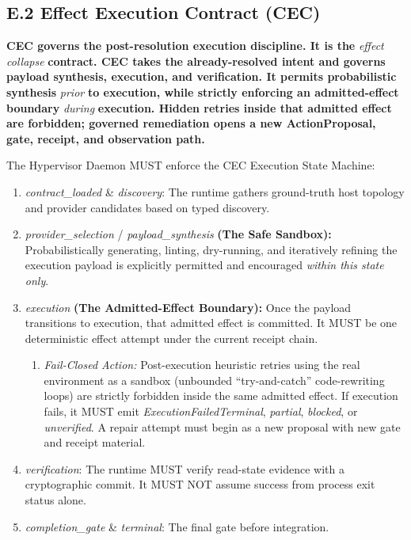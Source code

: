 \documentclass[
  11pt,
]{article}
\providecommand{\tightlist}{%
  \setlength{\itemsep}{0pt}\setlength{\parskip}{0pt}}
\begin{document}
\hypertarget{e.2-effect-execution-contract-cec}{%
\subsection{E.2 Effect Execution Contract
(CEC)}\label{e.2-effect-execution-contract-cec}}

\textbf{CEC governs the post-resolution execution discipline. It is the
}\emph{effect collapse}\textbf{ contract. CEC takes the already-resolved
intent and governs payload synthesis, execution, and verification. It
permits probabilistic synthesis }\emph{prior}\textbf{ to execution,
while strictly enforcing an admitted-effect boundary }\emph{during}\textbf{
execution. Hidden retries inside that admitted effect are forbidden;
governed remediation opens a new ActionProposal, gate, receipt, and
observation path.}

The Hypervisor Daemon MUST enforce the CEC Execution State Machine:

\begin{enumerate}
\def\labelenumi{\arabic{enumi}.}
\item
  \emph{contract\_loaded} \& \emph{discovery}: The runtime gathers
  ground-truth host topology and provider candidates based on typed
  discovery.
\item
  \emph{provider\_selection} / \emph{payload\_synthesis} \textbf{(The
  Safe Sandbox):} Probabilistically generating, linting, dry-running,
  and iteratively refining the execution payload is explicitly permitted
  and encouraged \emph{within this state only}.
\item
  \emph{execution} \textbf{(The Admitted-Effect Boundary):} Once the
  payload transitions to execution, that admitted effect is committed.
  It MUST be one deterministic effect attempt under the current receipt
  chain.

  \begin{enumerate}
  \def\labelenumii{\arabic{enumii}.}
  \tightlist
  \item
    \emph{Fail-Closed Action:} Post-execution heuristic retries using
    the real environment as a sandbox (unbounded ``try-and-catch''
    code-rewriting loops) are strictly forbidden inside the same
    admitted effect. If execution fails, it MUST emit
    \emph{ExecutionFailedTerminal}, \emph{partial}, \emph{blocked}, or
    \emph{unverified}. A repair attempt must begin as a new proposal with
    new gate and receipt material.
  \end{enumerate}
\item
  \emph{verification}: The runtime MUST verify read-state evidence with
  a cryptographic commit. It MUST NOT assume success from process exit
  status alone.
\item
  \emph{completion\_gate} \& \emph{terminal}: The final gate before
  integration.
\end{enumerate}
\end{document}
